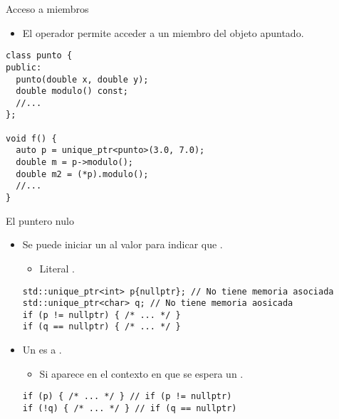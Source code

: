 \begin{frame}[t,fragile]{Acceso a miembros}
\begin{itemize}
  \item El operador \cppkey{->} permite acceder a un miembro del objeto
        apuntado.
\end{itemize}
\begin{lstlisting}
class punto {
public:
  punto(double x, double y);
  double modulo() const;
  //...
};

void f() {
  auto p = unique_ptr<punto>(3.0, 7.0);
  double m = p->modulo();
  double m2 = (*p).modulo();
  //...
}
\end{lstlisting}
\end{frame}

\begin{frame}[t,fragile]{El puntero nulo}
\begin{itemize}
  \item Se puede iniciar un  al valor 
         para indicar 
        que .
    \begin{itemize}
      \item Literal .
    \end{itemize}
\begin{lstlisting}
std::unique_ptr<int> p{nullptr}; // No tiene memoria asociada
std::unique_ptr<char> q; // No tiene memoria aosicada
if (p != nullptr) { /* ... */ }
if (q == nullptr) { /* ... */ }
\end{lstlisting}

  \item Un  es  
        a .
    \begin{itemize}
      \item Si aparece en el contexto en que se espera un .
    \end{itemize}
\begin{lstlisting}
if (p) { /* ... */ } // if (p != nullptr) 
if (!q) { /* ... */ } // if (q == nullptr)
\end{lstlisting}
\end{itemize}
\end{frame}

